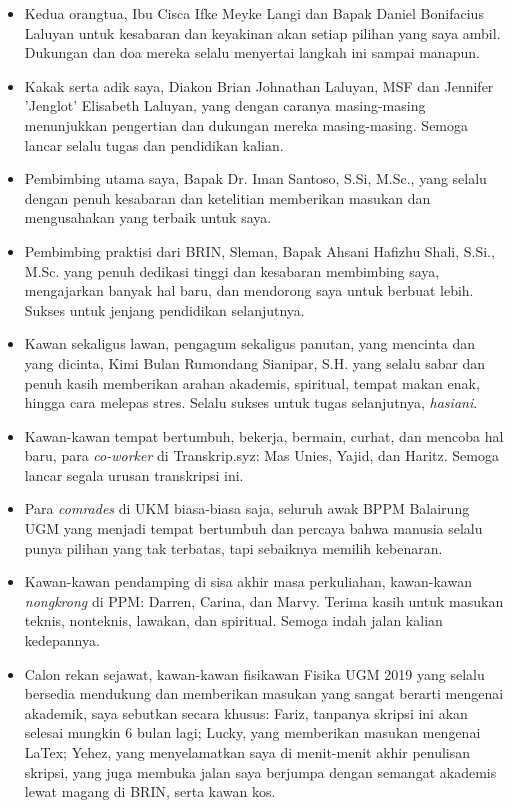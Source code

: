 \documentclass{skripsiactugm}
\begin{document}
  \begin{itemize}
    \item Kedua orangtua, Ibu Cisca Ifke Meyke Langi dan Bapak Daniel Bonifacius
      Laluyan untuk kesabaran dan keyakinan akan setiap pilihan yang saya ambil.
      Dukungan dan doa mereka selalu menyertai langkah ini sampai manapun.

    \item Kakak serta adik saya, Diakon Brian Johnathan Laluyan, MSF dan Jennifer
      'Jenglot' Elisabeth Laluyan, yang dengan caranya masing-masing menunjukkan
      pengertian dan dukungan mereka masing-masing. Semoga lancar selalu tugas dan
      pendidikan kalian.

    \item Pembimbing utama saya, Bapak Dr. Iman Santoso, S.Si, M.Sc., yang selalu
      dengan penuh kesabaran dan ketelitian memberikan masukan dan mengusahakan yang
      terbaik untuk saya.

    \item Pembimbing praktisi dari BRIN, Sleman, Bapak Ahsani Hafizhu Shali, S.Si.,
      M.Sc. yang penuh dedikasi tinggi dan kesabaran membimbing saya,
      mengajarkan banyak hal baru, dan mendorong saya untuk berbuat lebih.
      Sukses untuk jenjang pendidikan selanjutnya.

    \item Kawan sekaligus lawan, pengagum sekaligus panutan, yang mencinta dan yang
      dicinta, Kimi Bulan Rumondang Sianipar, S.H. yang selalu sabar dan penuh
      kasih memberikan arahan akademis, spiritual, tempat makan enak, hingga cara
      melepas stres. Selalu sukses untuk tugas selanjutnya, \textit{hasiani}.

    \item Kawan-kawan tempat bertumbuh, bekerja, bermain, curhat, dan mencoba hal
      baru, para \textit{co-worker} di Transkrip.syz: Mas Unies, Yajid, dan
      Haritz. Semoga lancar segala urusan transkripsi ini.

    \item Para \textit{comrades} di UKM biasa-biasa saja, seluruh awak BPPM Balairung
      UGM yang menjadi tempat bertumbuh dan percaya bahwa manusia selalu punya pilihan
      yang tak terbatas, tapi sebaiknya memilih kebenaran.

    \item Kawan-kawan pendamping di sisa akhir masa perkuliahan, kawan-kawan
      \textit{nongkrong} di PPM: Darren, Carina, dan Marvy. Terima kasih untuk masukan
      teknis, nonteknis, lawakan, dan spiritual. Semoga indah jalan kalian kedepannya.

    \item Calon rekan sejawat, kawan-kawan fisikawan Fisika UGM 2019 yang selalu
      bersedia mendukung dan memberikan masukan yang sangat berarti mengenai
      akademik, saya sebutkan secara khusus: Fariz, tanpanya skripsi ini akan selesai
      mungkin 6 bulan lagi; Lucky, yang memberikan masukan mengenai LaTex; Yehez,
      yang menyelamatkan saya di menit-menit akhir penulisan skripsi, yang juga
      membuka jalan saya berjumpa dengan semangat akademis lewat magang di BRIN,
      serta kawan kos.
  \end{itemize}
\end{document}
